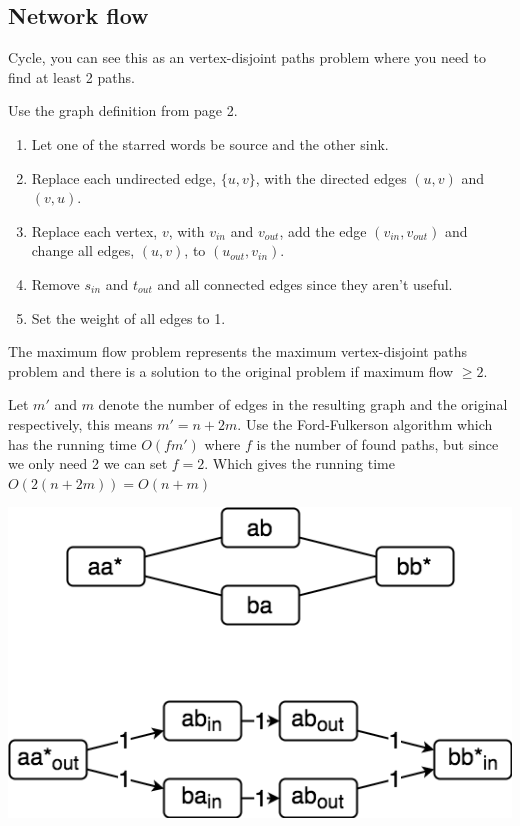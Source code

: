 \documentclass[a4paper]{article}
\newenvironment{task}[1]
{
	\begin{description}[align=right]
		\item [#1]
}{		%
	\end{description}
}
\DeclareMathOperator{\*}{\cdot}
\begin{document}
\subsection*{Network flow}

\begin{task}{9. (a)}
	 Cycle, you can see this as an vertex-disjoint paths problem where you need to find at least 2 paths.
\end{task}

\begin{task}{(b)}
	\qquad Use the graph definition from page 2.
	\begin{enumerate}
		\item Let one of the starred words be source and the other sink.
		\item Replace each undirected edge, $\{u,v\}$, with the directed edges $(u,v)$ and $(v,u)$.
		\item Replace each vertex, $v$, with $v_{in}$ and $v_{out}$, add the edge $(v_{in},v_{out})$ and change all edges, $(u,v)$, to $(u_{out},v_{in})$.
		\item Remove $s_{in}$ and $t_{out}$ and all connected edges since they aren't useful.
		\item Set the weight of all edges to 1.
	\end{enumerate}
	The maximum flow problem represents the maximum vertex-disjoint paths problem and there is a solution to the original problem if maximum flow $\geq 2$. 
	
	Let $m'$ and $m$ denote the number of edges in the resulting graph and the original respectively, this means $m'=n+2m$. Use the Ford-Fulkerson algorithm which has the running time $O(fm')$ where $f$ is the number of found paths, but since we only need 2 we can set $f=2$. Which gives the running time $O(2(n+2m))=O(n+m)$ 
	
	\includegraphics[scale=0.4]{120523-9b.png}
\end{task}
\end{document}
